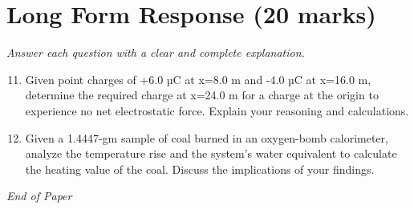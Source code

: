 \documentclass[12pt]{article}
\begin{document}
\section*{Long Form Response (20 marks)}
\textit{Answer each question with a clear and complete explanation.}
\begin{enumerate}[label=\arabic*.]
\setcounter{enumi}{10}
\item Given point charges of +6.0 µC at x=8.0 m and -4.0 µC at x=16.0 m, determine the required
charge at x=24.0 m for a charge at the origin to experience no net electrostatic force.
Explain your reasoning and calculations.
\item Given a 1.4447-gm sample of coal burned in an oxygen-bomb calorimeter, analyze the
temperature rise and the system's water equivalent to calculate the heating value of the
coal. Discuss the implications of your findings.
\end{enumerate}

\vfill
\noindent\textit{End of Paper}
\end{document}

